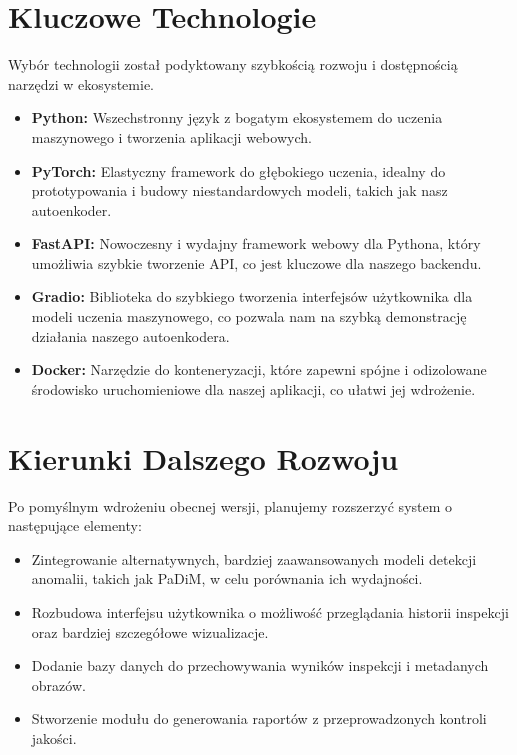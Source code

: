 \documentclass{article}
\begin{document}
\section{Kluczowe Technologie}
Wybór technologii został podyktowany szybkością rozwoju i dostępnością narzędzi w ekosystemie.
\begin{itemize}
    \item \textbf{Python:} Wszechstronny język z bogatym ekosystemem do uczenia maszynowego i tworzenia aplikacji webowych.
    \item \textbf{PyTorch:} Elastyczny framework do głębokiego uczenia, idealny do prototypowania i budowy niestandardowych modeli, takich jak nasz autoenkoder.
    \item \textbf{FastAPI:} Nowoczesny i wydajny framework webowy dla Pythona, który umożliwia szybkie tworzenie API, co jest kluczowe dla naszego backendu.
    \item \textbf{Gradio:} Biblioteka do szybkiego tworzenia interfejsów użytkownika dla modeli uczenia maszynowego, co pozwala nam na szybką demonstrację działania naszego autoenkodera.
    \item \textbf{Docker:} Narzędzie do konteneryzacji, które zapewni spójne i odizolowane środowisko uruchomieniowe dla naszej aplikacji, co ułatwi jej wdrożenie.
\end{itemize}

\section{Kierunki Dalszego Rozwoju}
Po pomyślnym wdrożeniu obecnej wersji, planujemy rozszerzyć system o następujące elementy:
\begin{itemize}
    \item Zintegrowanie alternatywnych, bardziej zaawansowanych modeli detekcji anomalii, takich jak PaDiM, w celu porównania ich wydajności.
    \item Rozbudowa interfejsu użytkownika o możliwość przeglądania historii inspekcji oraz bardziej szczegółowe wizualizacje.
    \item Dodanie bazy danych do przechowywania wyników inspekcji i metadanych obrazów.
    \item Stworzenie modułu do generowania raportów z przeprowadzonych kontroli jakości.
\end{itemize}
\end{document}
